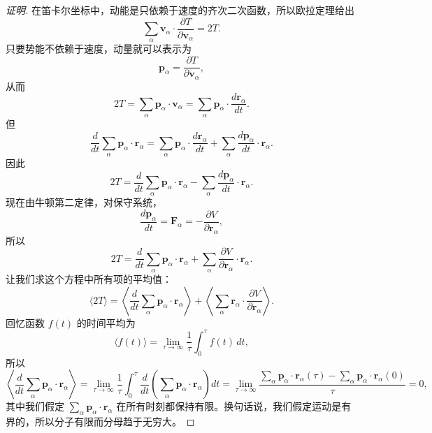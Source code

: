 \begin{proof}[证明]
在笛卡尔坐标中，动能是只依赖于速度的齐次二次函数，所以欧拉定理给出
\begin{equation}\label{eq:1.vir1}
\sum_{\alpha}\mathbf{v}_\alpha\cdot\frac{\partial T}{\partial \mathbf{v}_\alpha} = 2T.
\end{equation}
只要势能不依赖于速度，动量就可以表示为
\begin{equation*}
\mathbf{p}_\alpha = \frac{\partial T}{\partial \mathbf{v}_\alpha},
\end{equation*}
从而
\begin{equation}\label{eq:1.vir2}
2T = \sum_{\alpha}\mathbf{p}_\alpha\cdot\mathbf{v}_\alpha = \sum_{\alpha}\mathbf{p}_\alpha\cdot\frac{d\mathbf{r}_\alpha}{dt}.
\end{equation}
但
\begin{equation}\label{eq:1.vir3}
\frac{d}{dt}\sum_{\alpha}\mathbf{p}_\alpha\cdot\mathbf{r}_\alpha = \sum_{\alpha}\mathbf{p}_\alpha\cdot\frac{d\mathbf{r}_\alpha}{dt} + \sum_{\alpha}\frac{d\mathbf{p}_\alpha}{dt}\cdot\mathbf{r}_\alpha.
\end{equation}
因此
\begin{equation}\label{eq:1.vir4}
2T = \frac{d}{dt}\sum_{\alpha}\mathbf{p}_\alpha\cdot\mathbf{r}_\alpha - \sum_{\alpha}\frac{d\mathbf{p}_\alpha}{dt}\cdot\mathbf{r}_\alpha.
\end{equation}
现在由牛顿第二定律，对保守系统，
\begin{equation*}
\frac{d\mathbf{p}_\alpha}{dt} = \mathbf{F}_\alpha = -\frac{\partial V}{\partial \mathbf{r}_\alpha},
\end{equation*}
所以
\begin{equation}\label{eq:1.vir5}
2T = \frac{d}{dt}\sum_{\alpha}\mathbf{p}_\alpha\cdot\mathbf{r}_\alpha + \sum_{\alpha}\frac{\partial V}{\partial \mathbf{r}_\alpha}\cdot\mathbf{r}_\alpha.
\end{equation}
让我们求这个方程中所有项的平均值：
\begin{equation}\label{eq:1.vir6}
\langle 2T\rangle = \left\langle\frac{d}{dt}\sum_{\alpha}\mathbf{p}_\alpha\cdot\mathbf{r}_\alpha\right\rangle + \left\langle\sum_{\alpha}\mathbf{r}_\alpha\cdot\frac{\partial V}{\partial \mathbf{r}_\alpha}\right\rangle.
\end{equation}
回忆函数 $f(t)$ 的时间平均为
\begin{equation}\label{eq:1.avg}
\langle f(t)\rangle = \lim_{\tau\to\infty}\frac{1}{\tau}\int_0^{\tau} f(t)\,dt,
\end{equation}
所以
\begin{equation}\label{eq:1.vir7}
\left\langle\frac{d}{dt}\sum_{\alpha}\mathbf{p}_\alpha\cdot\mathbf{r}_\alpha\right\rangle = \lim_{\tau\to\infty}\frac{1}{\tau}\int_0^{\tau}\frac{d}{dt}\left(\sum_{\alpha}\mathbf{p}_\alpha\cdot\mathbf{r}_\alpha\right)dt = \lim_{\tau\to\infty}\frac{\sum_{\alpha}\mathbf{p}_\alpha\cdot\mathbf{r}_\alpha(\tau) - \sum_{\alpha}\mathbf{p}_\alpha\cdot\mathbf{r}_\alpha(0)}{\tau} = 0,
\end{equation}
其中我们假定 $\sum_{\alpha}\mathbf{p}_\alpha\cdot\mathbf{r}_\alpha$ 在所有时刻都保持有限。换句话说，我们假定运动是有界的，所以分子有限而分母趋于无穷大。


\end{proof}
